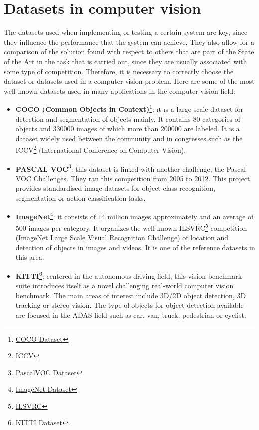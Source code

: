 \section{Datasets in computer vision}
The datasets used when implementing or testing a certain system are key, since they influence the performance that the system can achieve. They also allow for a comparison of the solution found with respect to others that are part of the State of the Art in the task that is carried out, since they are usually associated with some type of competition. Therefore, it is necessary to correctly choose the dataset or datasets used in a computer vision problem. Here are some of the most well-known datasets used in many applications in the computer vision field:
\begin{itemize}
\item \textbf{COCO (Common Objects in Context)}\footnote{\href{http://cocodataset.org/#home}{COCO Dataset}}: it is a large scale dataset for detection and segmentation of objects mainly. It contains 80 categories of objects and 330000 images of which more than 200000 are labeled. It is a dataset widely used between the community and in congresses such as the ICCV\footnote{\href{http://iccv2019.thecvf.com/}{ICCV}} (International Conference on Computer Vision).
\item \textbf{PASCAL VOC}\footnote {\href{http://host.robots.ox.ac.uk/pascal/VOC/}{PascalVOC Dataset}}: this dataset is linked with another challenge, the Pascal VOC Challenges. They ran this competition from 2005 to 2012. This project provides standardised image datasets for object class recognition, segmentation or action classification tasks.
\item \textbf{ImageNet}\footnote {\href{http://www.image-net.org/}{ImageNet Dataset}}: it consists of 14 million images approximately and an average of 500 images per category. It organizes the well-known ILSVRC\footnote{\href{http://image-net.org/challenges/LSVRC/}{ILSVRC}} competition (ImageNet Large Scale Visual Recognition Challenge) of location and detection of objects in images and videos. It is one of the reference datasets in this area.
\item \textbf{KITTI}\footnote {\href{http://www.cvlibs.net/datasets/kitti/}{KITTI Dataset}}: centered in the autonomous driving field, this vision benchmark suite introduces itself as a novel challenging real-world computer vision benchmark. The main areas of interest include 3D/2D object detection, 3D tracking or stereo vision. The type of objects for object detection available are focused in the ADAS field such as car, van, truck, pedestrian or cyclist.

\end{itemize}
